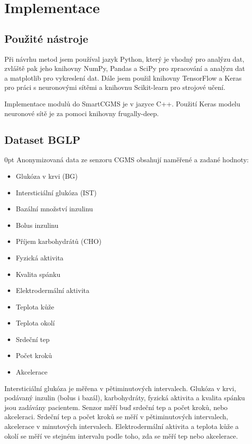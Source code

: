 \chapter{Implementace}

\section{Použité nástroje}

Při návrhu metod jsem používal jazyk Python, který je vhodný pro analýzu dat, zvláště pak jeho knihovny NumPy, Pandas a SciPy pro zpracování a analýzu dat a matplotlib pro vykreslení dat. Dále jsem použil knihovny TensorFlow a Keras pro práci s neuronovými sítěmi a knihovnu Scikit-learn pro strojové učení.

Implementace modulů do SmartCGMS je v jazyce C++. Použití Keras modelu neuronové sítě je za pomoci knihovny frugally-deep\citep{cho.frugally}.

\section{Dataset BGLP}
\label{ch:bglp}

\begin{setlength}{\parskip}{0pt}
Anonymizovaná data ze senzoru CGMS obsahují naměřené a zadané hodnoty:
\begin{itemize}
\setlength\itemsep{0em}
\item Glukóza v krvi (BG)
\item Intersticiální glukóza (IST)
\item Bazální množství inzulinu
\item Bolus inzulinu
\item Příjem karbohydrátů (CHO)
\item Fyzická aktivita
\item Kvalita spánku
\item Elektrodermální aktivita
\item Teplota kůže
\item Teplota okolí
\item Srdeční tep
\item Počet kroků
\item Akcelerace
\end{itemize}
\end{setlength}

Intersticiální glukóza je měřena v pětiminutových intervalech. Glukóza v krvi, podávaný inzulin (bolus i bazál), karbohydráty, fyzická aktivita a kvalita spánku jsou zadávány pacientem. Senzor měří buď srdeční tep a počet kroků, nebo akceleraci. Srdeční tep a počet kroků se měří v pětiminutových intervalech, akcelerace v minutových intervalech. Elektrodermální aktivita a teplota kůže a okolí se měří ve stejném intervalu podle toho, zda se měří tep nebo akcelerace.


